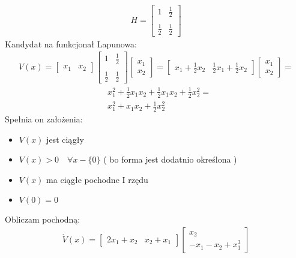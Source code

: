 \documentclass[a4paper,11pt]{article}
\begin{document}
\begin{align*}
H = 
\begin{bmatrix}
1 & \frac{1}{2} \\ \\
\frac{1}{2} & \frac{1}{2}
\end{bmatrix}
\end{align*}
Kandydat na funkcjonał Lapunowa:
\begin{align*}
V(x) = 
\begin{bmatrix}
x_{1} & x_{2}
\end{bmatrix}
\begin{bmatrix}
1 & \frac{1}{2} \\ \\
\frac{1}{2} & \frac{1}{2}
\end{bmatrix}
\begin{bmatrix}
x_{1} \\
x_{2}
\end{bmatrix} = 
\begin{bmatrix}
x_{1}+\frac{1}{2}x_{2} & \frac{1}{2}x_{1}+\frac{1}{2}x_{2}
\end{bmatrix}
\begin{bmatrix}
x_{1} \\
x_{2}
\end{bmatrix} = 
\end{align*}
\begin{align*}
& x_{1}^{2}+\frac{1}{2}x_{1}x_{2}+\frac{1}{2}x_{1}x_{2}+\frac{1}{2}x_{2}^{2} = \\
& x_{1}^{2}+x_{1}x_{2}+\frac{1}{2}x_{2}^{2}
\end{align*}
Spełnia on założenia: \\
\begin{itemize}
\item \( V(x) \) jest ciągły 
\item \( V(x)>0 \quad \forall x - \{ 0 \} \) ( bo forma jest dodatnio określona )
\item \( V(x) \) ma ciągłe pochodne I rzędu
\item \( V(0) = 0 \) 
\end{itemize}
Obliczam pochodną: \\ 
\begin{align*}
\dot{V}(x)= 
\begin{bmatrix}
2x_{1}+x_{2} & x_{2}+x_{1}
\end{bmatrix}
\begin{bmatrix}
x_{2} \\
-x_{1} - x_{2} + x_{1}^{3}
\end{bmatrix}   
\end{align*}
\end{document}
